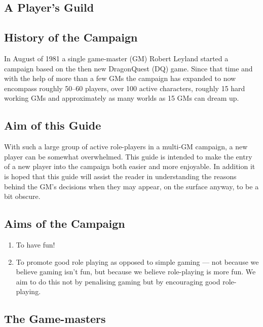 \documentclass[twoside,a4paper]{article}
\begin{document}
\begin{multicols}{2}

\section{A Player's Guild}

\subsection{History of the Campaign}

In August of 1981 a single game-master (GM) Robert Leyland started a
campaign based on the then new DragonQuest (DQ) game.  Since that time
and with the help of more than a few GMs the campaign has expanded to
now encompass roughly 50--60 players, over 100 active characters,
roughly 15 hard working GMs and approximately as many worlds as 15
GMs can dream up.

\subsection{Aim of this Guide}

With such a large group of active role-players in a multi-GM campaign,
a new player can be somewhat overwhelmed.  This guide is intended to
make the entry of a new player into the campaign both easier and more
enjoyable.  In addition it is hoped that this guide will assist the
reader in understanding the reasons behind the GM's decisions when
they may appear, on the surface anyway, to be a bit obscure.

\subsection{Aims of the Campaign}

\begin{enumerate}

\item
To have fun!

\item
To promote good role playing as opposed to simple gaming --- not
because we believe gaming isn't fun, but because we believe
role-playing is more fun.  We aim to do this not by penalising gaming
but by encouraging good role-playing.

\end{enumerate}

\subsection{The Game-masters}


\end{multicols}
\end{document}
